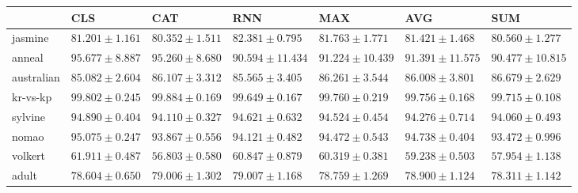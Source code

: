 \begin{tabular}{lllllll}
\toprule
 & CLS & CAT & RNN & MAX & AVG & SUM \\
\midrule
jasmine & $81.201 \pm 1.161$ & $80.352 \pm 1.511$ & $82.381 \pm 0.795$ & $81.763 \pm 1.771$ & $81.421 \pm 1.468$ & $80.560 \pm 1.277$ \\
anneal & $95.677 \pm 8.887$ & $95.260 \pm 8.680$ & $90.594 \pm 11.434$ & $91.224 \pm 10.439$ & $91.391 \pm 11.575$ & $90.477 \pm 10.815$ \\
australian & $85.082 \pm 2.604$ & $86.107 \pm 3.312$ & $85.565 \pm 3.405$ & $86.261 \pm 3.544$ & $86.008 \pm 3.801$ & $86.679 \pm 2.629$ \\
kr-vs-kp & $99.802 \pm 0.245$ & $99.884 \pm 0.169$ & $99.649 \pm 0.167$ & $99.760 \pm 0.219$ & $99.756 \pm 0.168$ & $99.715 \pm 0.108$ \\
sylvine & $94.890 \pm 0.404$ & $94.110 \pm 0.327$ & $94.621 \pm 0.632$ & $94.524 \pm 0.454$ & $94.276 \pm 0.714$ & $94.060 \pm 0.493$ \\
nomao & $95.075 \pm 0.247$ & $93.867 \pm 0.556$ & $94.121 \pm 0.482$ & $94.472 \pm 0.543$ & $94.738 \pm 0.404$ & $93.472 \pm 0.996$ \\
volkert & $61.911 \pm 0.487$ & $56.803 \pm 0.580$ & $60.847 \pm 0.879$ & $60.319 \pm 0.381$ & $59.238 \pm 0.503$ & $57.954 \pm 1.138$ \\
adult & $78.604 \pm 0.650$ & $79.006 \pm 1.302$ & $79.007 \pm 1.168$ & $78.759 \pm 1.269$ & $78.900 \pm 1.124$ & $78.311 \pm 1.142$ \\
\bottomrule
\end{tabular}
